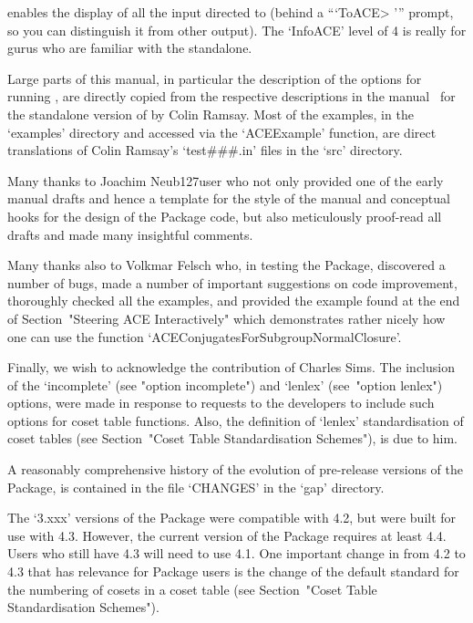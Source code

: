 enables the display of all the input  directed  to  {\ACE}  (behind  a
```ToACE> ''' prompt, so you can distinguish it  from  other  output).
The `InfoACE' level of 4 is really for gurus who are familiar with the
{\ACE} standalone.


Large parts of this manual,  in  particular  the  description  of  the
options for running {\ACE}, are directly copied  from  the  respective
descriptions in the manual~\cite{Ram99ace} for the standalone version  of
{\ACE} by Colin Ramsay.  Most  of  the  examples,  in  the  `examples'
directory and accessed  via  the  `ACEExample'  function,  are  direct
translations of Colin Ramsay's  `test\#\#\#.in'  files  in  the  `src'
directory.

Many thanks to Joachim Neub{\accent127u}ser who not only provided  one
of the early manual drafts and hence a template for the style  of  the
manual and conceptual hooks for the design of the  Package  code,  but
also meticulously proof-read  all  drafts  and  made  many  insightful
comments.

Many thanks also to Volkmar Felsch who, in testing the {\ACE} Package,
discovered a number of bugs, made a number of important suggestions on
code improvement, thoroughly checked all the  examples,  and  provided
the example found at the end of Section~"Steering  ACE  Interactively"
which  demonstrates  rather  nicely  how  one  can  use  the  function
`ACEConjugatesForSubgroupNormalClosure'.

Finally, we wish to acknowledge the contribution of Charles Sims.  The
inclusion of the `incomplete' (see "option incomplete")  and  `lenlex'
(see~"option lenlex") options, were made in response  to  requests  to
the  {\GAP}  developers  to  include  such  options  for  coset  table
functions. Also, the definition of `lenlex' standardisation  of  coset
tables (see Section~"Coset Table Standardisation Schemes"), is due  to
him.


A reasonably comprehensive history of  the  evolution  of  pre-release
versions of the {\ACE} Package, is contained in the file `CHANGES'  in
the `gap' directory. 

The `3.xxx' versions of the {\ACE} Package were compatible with {\GAP}
4.2, but were built for use with  {\GAP}  4.3.  However,  the  current
version of the {\ACE} Package requires at least {\GAP} 4.4. Users  who
still have {\GAP} 4.3 will need  to  use  {\ACE}  4.1.  One  important
change in {\GAP} from {\GAP} 4.2 to {\GAP} 4.3 that has relevance  for
{\ACE} Package users is the change of the  default  standard  for  the
numbering of  cosets  in  a  coset  table  (see  Section~"Coset  Table
Standardisation Schemes").

